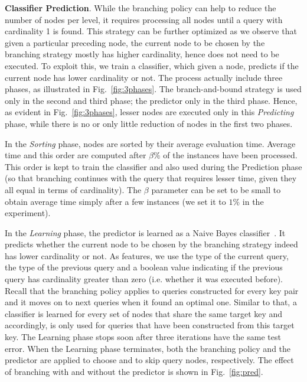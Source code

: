\textbf{Classifier Prediction}. 
While the branching policy can help to reduce the number of nodes per level, it requires processing all nodes until a query with cardinality 1 is found. This strategy can be further optimized as we observe that given a particular preceding node, the current node to be chosen by the branching strategy mostly has higher cardinality, hence does not need to be executed. To exploit this, we train a classifier, which given a node, predicts if the current node has lower cardinality or not. The process actually include three phases, as illustrated in Fig.~\ref{fig:3phases}. The branch-and-bound strategy is used only in the second and third phase; the predictor only in the third phase. Hence, as evident in Fig.~\ref{fig:3phases}, lesser nodes are executed only in this \emph{Predicting} phase, while there is no or only little reduction of nodes in the first two phases. 

In the \emph{Sorting} phase, nodes are sorted by their average evaluation time. Average time and this order are computed after $\beta \%$ of the instances have been processed. This order is kept to train the classifier and also used during the Prediction phase (so that branching continues with the query that requires lesser time, given they all equal in terms of cardinality). The $\beta$ parameter can be set to be small to obtain average time simply after a few instances (we set it to $1\%$ in the experiment).
 
In the \emph{Learning} phase, the predictor is learned as a Naive Bayes classifier~\cite{Hand2001Idiots}.  It predicts whether the current node to be chosen by the branching strategy indeed has lower cardinality or not. As features, we use the type of the current query, the type of the previous query and a boolean value indicating if the previous query has cardinality greater than zero (i.e. whether it was executed before). 
Recall that the branching policy applies to queries constructed for every key pair and it moves on to next queries when it found an optimal one. Similar to that, a classifier is learned for every set of nodes that share the same target key and accordingly, is only used for queries that have been constructed from this target key. The Learning phase stops soon after three iterations have the same test error. 
When the Learning phase terminates, both the branching policy and the predictor are applied to choose and to skip query nodes, respectively. The effect of branching with and without the predictor is shown in Fig.~\ref{fig:pred}. 

